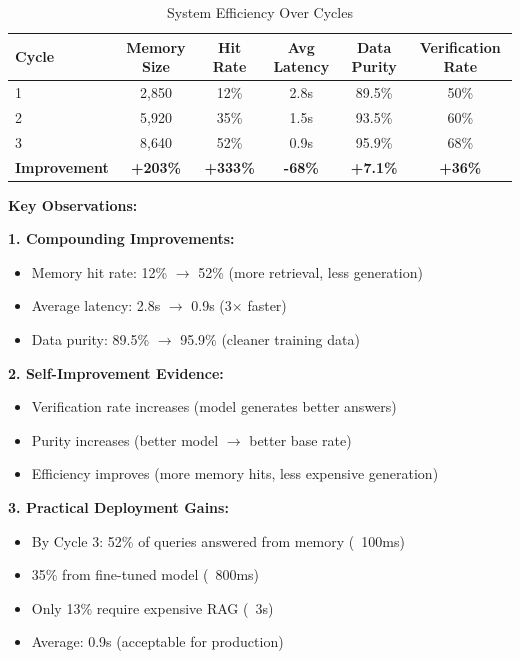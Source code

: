 \documentclass[12pt,a4paper]{article}
\theoremstyle{definition}
\begin{document}
\begin{table}[htbp]
\centering
\caption{System Efficiency Over Cycles}
\begin{tabular}{lccccc}
\toprule
\textbf{Cycle} & \textbf{Memory Size} & \textbf{Hit Rate} & \textbf{Avg Latency} & \textbf{Data Purity} & \textbf{Verification Rate} \\
\midrule
1 & 2,850 & 12\% & 2.8s & 89.5\% & 50\% \\
2 & 5,920 & 35\% & 1.5s & 93.5\% & 60\% \\
3 & 8,640 & 52\% & 0.9s & 95.9\% & 68\% \\
\midrule
\textbf{Improvement} & \textbf{+203\%} & \textbf{+333\%} & \textbf{-68\%} & \textbf{+7.1\%} & \textbf{+36\%} \\
\bottomrule
\end{tabular}
\end{table}

\begin{keyinsightbox}
\textbf{Key Observations:}

\textbf{1. Compounding Improvements:}
\begin{itemize}
    \item Memory hit rate: 12\% $\rightarrow$ 52\% (more retrieval, less generation)
    \item Average latency: 2.8s $\rightarrow$ 0.9s (3$\times$ faster)
    \item Data purity: 89.5\% $\rightarrow$ 95.9\% (cleaner training data)
\end{itemize}

\textbf{2. Self-Improvement Evidence:}
\begin{itemize}
    \item Verification rate increases (model generates better answers)
    \item Purity increases (better model $\rightarrow$ better base rate)
    \item Efficiency improves (more memory hits, less expensive generation)
\end{itemize}

\textbf{3. Practical Deployment Gains:}
\begin{itemize}
    \item By Cycle 3: 52\% of queries answered from memory (~100ms)
    \item 35\% from fine-tuned model (~800ms)
    \item Only 13\% require expensive RAG (~3s)
    \item Average: 0.9s (acceptable for production)
\end{itemize}
\end{keyinsightbox}
\end{document}
